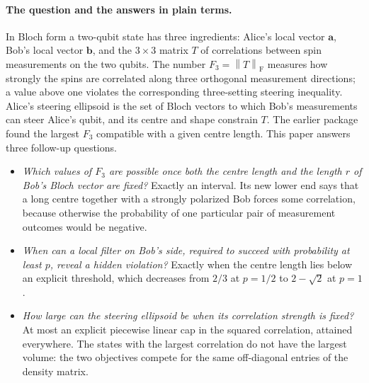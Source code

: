 \documentclass[11pt,a4paper]{article}
\theoremstyle{remark}\newtheorem{remark}[theorem]{Remark}
\newcommand{\norm}[1]{\left\lVert#1\right\rVert}
\renewcommand{\aa}{\mathbf a}\newcommand{\bb}{\mathbf b}
\begin{document}
\paragraph{The question and the answers in plain terms.} In Bloch form a
two-qubit state has three ingredients: Alice's local vector $\aa$, Bob's local
vector $\bb$, and the $3\times3$ matrix $T$ of correlations between spin
measurements on the two qubits. The number $F_3=\norm T_{\mathrm F}$ measures
how strongly the spins are correlated along three orthogonal measurement
directions; a value above one violates the corresponding three-setting
steering inequality. Alice's steering ellipsoid is the set of Bloch vectors
to which Bob's measurements can steer Alice's qubit, and its centre and shape
constrain $T$. The earlier package found the largest $F_3$ compatible with a
given centre length. This paper answers three follow-up questions.
\begin{itemize}
\item \emph{Which values of $F_3$ are possible once both the centre length and
the length $r$ of Bob's Bloch vector are fixed?} Exactly an interval. Its new
lower end says that a long centre together with a strongly polarized Bob forces
some correlation, because otherwise the probability of one particular pair of
measurement outcomes would be negative.
\item \emph{When can a local filter on Bob's side, required to succeed with
probability at least $p$, reveal a hidden violation?} Exactly when the centre
length lies below an explicit threshold, which decreases from $2/3$ at $p=1/2$
to $2-\sqrt2$ at $p=1$.
\item \emph{How large can the steering ellipsoid be when its correlation
strength is fixed?} At most an explicit piecewise linear cap in the squared
correlation, attained everywhere. The states with the largest correlation do
not have the largest volume: the two objectives compete for the same
off-diagonal entries of the density matrix.
\end{itemize}
\end{document}
